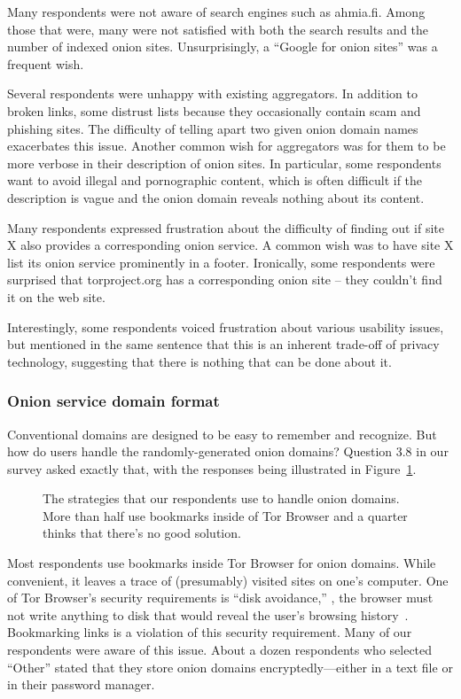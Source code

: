 Many respondents were not aware of search engines such as ahmia.fi.  Among those
that were, many were not satisfied with both the search results and the number
of indexed onion sites.  Unsurprisingly, a ``Google for onion sites'' was a
frequent wish.

Several respondents were unhappy with existing aggregators.  In addition to
broken links, some distrust lists because they occasionally contain scam and
phishing sites.  The difficulty of telling apart two given onion domain names
exacerbates this issue.  Another common wish for aggregators was for them to be
more verbose in their description of onion sites.  In particular, some
respondents want to avoid illegal and pornographic content, which is often
difficult if the description is vague and the onion domain reveals nothing about
its content.

Many respondents expressed frustration about the difficulty of finding out if
site X also provides a corresponding onion service.  A common wish was to have
site X list its onion service prominently in a footer.  Ironically, some
respondents were surprised that torproject.org has a corresponding onion site --
they couldn't find it on the web site.

Interestingly, some respondents voiced frustration about various usability
issues, but mentioned in the same sentence that this is an inherent trade-off of
privacy technology, suggesting that there is nothing that can be done about it.

\subsubsection{Onion service domain format}

Conventional domains are designed to be easy to remember and recognize.  But how do users
handle the randomly-generated onion domains?  Question 3.8 in our survey asked
exactly that, with the responses being illustrated in
Figure~\ref{fig:onion-domain-mgmt}.

\begin{figure}[t]
    \centering
    
    \caption{The strategies that our respondents use to handle onion domains.
    More than half use bookmarks inside of Tor Browser and a quarter thinks that
    there's no good solution.}
    \label{fig:onion-domain-mgmt}
\end{figure}

Most respondents use bookmarks inside Tor Browser for onion domains.  While
convenient, it leaves a trace of (presumably) visited sites on one's computer.
One of Tor Browser's security requirements is ``disk avoidance,'' \ie, the
browser must not write anything to disk that would reveal the user's browsing
history~\cite[\S~2.1]{Perry2017a}.  Bookmarking links is a violation of this
security requirement.  Many of our respondents were aware of this issue.  About
a dozen respondents who selected ``Other'' stated that they store onion domains
encryptedly---either in a text file or in their password manager.


